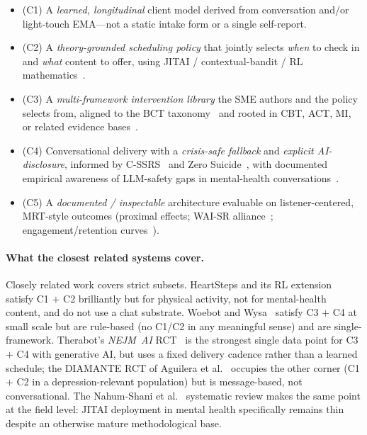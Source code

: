 \documentclass[11pt,a4paper]{article}
\begin{document}
\begin{itemize}\setlength{\itemsep}{0pt}
  \item (C1) A \emph{learned, longitudinal} client model derived
    from conversation and/or light-touch EMA---not a static intake
    form or a single self-report.
  \item (C2) A \emph{theory-grounded scheduling policy} that
    jointly selects \emph{when} to check in and \emph{what}
    content to offer, using JITAI / contextual-bandit / RL
    mathematics~\cite{NahumShani2018JITAI,Klasnja2015MRT,Liao2020PersonalizedHeartSteps}.
  \item (C3) A \emph{multi-framework intervention library} the SME
    authors and the policy selects from, aligned to the BCT
    taxonomy~\cite{Michie2013BCTTaxonomy} and rooted in CBT, ACT,
    MI, or related evidence
    bases~\cite{Hofmann2012CBTMeta,ATjak2015ACTMeta,Lundahl2010MIMeta}.
  \item (C4) Conversational delivery with a \emph{crisis-safe
    fallback} and \emph{explicit AI-disclosure}, informed by
    C-SSRS~\cite{Posner2011CSSRS} and Zero
    Suicide~\cite{Labouliere2018ZeroSuicide}, with documented
    empirical awareness of LLM-safety gaps in mental-health
    conversations~\cite{DeFreitas2024ChatbotSafety,Scholich2025TherapistVsChatbot,Parks2025CriticalEval}.
  \item (C5) A \emph{documented / inspectable} architecture evaluable
    on listener-centered, MRT-style outcomes (proximal effects;
    WAI-SR alliance~\cite{Hatcher2006WAISR}; engagement/retention
    curves~\cite{Linardon2020Attrition}).
\end{itemize}

\paragraph{What the closest related systems cover.}
Closely related work covers strict subsets. HeartSteps and its
RL extension~\cite{Klasnja2018HeartStepsMRT,Liao2020PersonalizedHeartSteps}
satisfy C1 $+$ C2 brilliantly but for physical activity, not for
mental-health content, and do not use a chat substrate. Woebot and
Wysa~\cite{Fitzpatrick2017Woebot,Inkster2018Wysa} satisfy C3 $+$ C4
at small scale but are rule-based (no C1/C2 in any meaningful
sense) and are single-framework. Therabot's
\textit{NEJM~AI} RCT~\cite{Heinz2025TherabotRCT} is the strongest
single data point for C3 $+$ C4 with generative AI, but uses a
fixed delivery cadence rather than a learned schedule; the
DIAMANTE RCT of Aguilera et al.~\cite{Aguilera2024DIAMANTERL}
occupies the other corner (C1 $+$ C2 in a depression-relevant
population) but is message-based, not conversational. The
Nahum-Shani et al.~\cite{NahumShani2025JITAIMHReview} systematic
review makes the same point at the field level: JITAI deployment
in mental health specifically remains thin despite an otherwise
mature methodological base.
\end{document}
